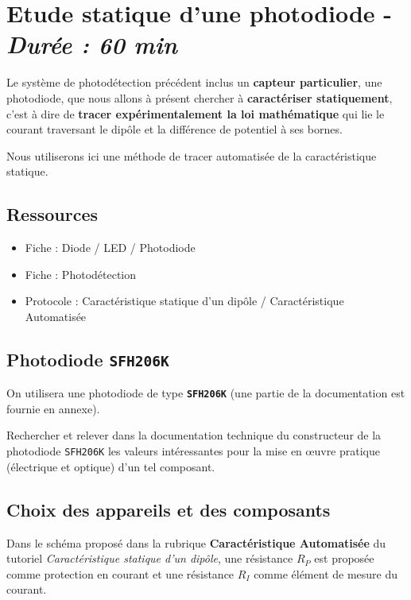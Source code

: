 \section{Etude statique d'une photodiode - \textit{Durée : 60 min}}

Le système de photodétection précédent inclus un \textbf{capteur particulier}, une photodiode, que nous allons à présent chercher à \textbf{caractériser statiquement}, c'est à dire de \textbf{tracer expérimentalement la loi mathématique} qui lie le courant traversant le dipôle et la différence de potentiel à ses bornes.

Nous utiliserons ici une méthode de tracer automatisée de la caractéristique statique.


\subsection{Ressources}

\begin{itemize}
	\item Fiche : Diode / LED / Photodiode
	\item Fiche : Photodétection
	\item Protocole : Caractéristique statique d'un dipôle / Caractéristique Automatisée
\end{itemize}


\subsection{Photodiode \texttt{SFH206K}}

On utilisera une photodiode de type \textbf{\texttt{SFH206K}} (une partie de la documentation est fournie en annexe).

\Quest Rechercher et relever dans la documentation technique du constructeur de la photodiode \texttt{SFH206K} les valeurs intéressantes pour la mise en \oe{}uvre pratique (électrique et optique) d'un tel composant.


\subsection{Choix des appareils et des composants}

Dans le schéma proposé dans la rubrique \textbf{Caractéristique Automatisée} du tutoriel \textit{Caractéristique statique d'un dipôle}, une résistance $R_P$ est proposée comme protection en courant et une résistance $R_I$ comme élément de mesure du courant.

